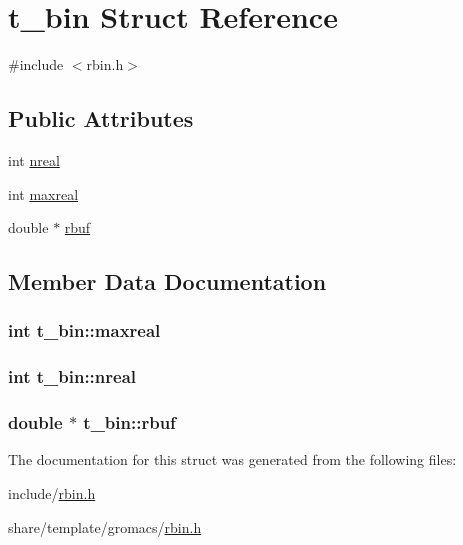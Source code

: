 \hypertarget{structt__bin}{\section{t\-\_\-bin \-Struct \-Reference}
\label{structt__bin}
}


{\ttfamily \#include $<$rbin.\-h$>$}

\subsection*{\-Public \-Attributes}
\begin{DoxyCompactItemize}
\item 
int \hyperlink{structt__bin_a4a077333b7489bc7c013d09ece0a144b}{nreal}
\item 
int \hyperlink{structt__bin_aecfa710893d9b8f43861f71c742d945d}{maxreal}
\item 
double $\ast$ \hyperlink{structt__bin_a1d9b16f86c87d27839f521842fbfdefa}{rbuf}
\end{DoxyCompactItemize}


\subsection{\-Member \-Data \-Documentation}
\hypertarget{structt__bin_aecfa710893d9b8f43861f71c742d945d}{
\subsubsection[{maxreal}]{\setlength{\rightskip}{0pt plus 5cm}int {\bf t\-\_\-bin\-::maxreal}}}\label{structt__bin_aecfa710893d9b8f43861f71c742d945d}
\hypertarget{structt__bin_a4a077333b7489bc7c013d09ece0a144b}{
\subsubsection[{nreal}]{\setlength{\rightskip}{0pt plus 5cm}int {\bf t\-\_\-bin\-::nreal}}}\label{structt__bin_a4a077333b7489bc7c013d09ece0a144b}
\hypertarget{structt__bin_a1d9b16f86c87d27839f521842fbfdefa}{
\subsubsection[{rbuf}]{\setlength{\rightskip}{0pt plus 5cm}double $\ast$ {\bf t\-\_\-bin\-::rbuf}}}\label{structt__bin_a1d9b16f86c87d27839f521842fbfdefa}


\-The documentation for this struct was generated from the following files\-:\begin{DoxyCompactItemize}
\item 
include/\hyperlink{include_2rbin_8h}{rbin.\-h}\item 
share/template/gromacs/\hyperlink{share_2template_2gromacs_2rbin_8h}{rbin.\-h}\end{DoxyCompactItemize}
